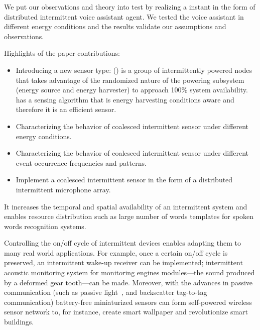 We put our observations and theory into test by realizing a \sys instant in the form of distributed intermittent voice assistant agent. We tested the voice assistant in different energy conditions and the results validate our assumptions and observations. 

Highlights of the paper contributions:
\begin{itemize}
		\item Introducing a new sensor type: \textit{\fullsys} (\sys) is a group of intermittently powered nodes that takes advantage of the randomized nature of the powering subsystem (energy source and energy harvester) to approach 100\% system availability. \sys has a sensing algorithm that is energy harvesting conditions aware and therefore it is an efficient sensor. 
		\item Characterizing the behavior of coalesced intermittent sensor under different energy conditions.
		\item Characterizing the behavior of coalesced intermittent sensor under different event occurrence frequencies and patterns. 
		\item Implement a coalesced intermittent sensor in the form of a distributed intermittent microphone array. 
\end{itemize}





%
 It increases the temporal and spatial availability of an intermittent system and enables resource distribution such as large number of words templates for spoken words recognition systems. 

Controlling the on/off cycle of intermittent devices enables adapting them to many real world applications. For example, once a certain on/off cycle is preserved, an intermittent wake-up receiver can be implemented; intermittent acoustic monitoring system for monitoring engines modules---the sound produced by a deformed gear tooth---can be made. Moreover, with the advances in passive communication (such as passive light~\cite{}, and backscatter tag-to-tag~\cite{} communication) battery-free miniaturized sensors can form self-powered wireless sensor network to, for instance, create smart wallpaper and revolutionize smart buildings. 


